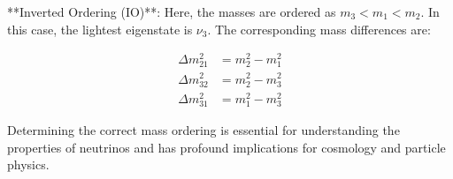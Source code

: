 **Inverted Ordering (IO)**: Here, the masses are ordered as \( m_3 < m_1 < m_2 \).
In this case, the lightest eigenstate is $\nu_3$.
The corresponding mass differences are:

\begin{align}
  \Delta m_{21}^2 &= m_2^2 - m_1^2 \\
  \Delta m_{32}^2 &= m_2^2 - m_3^2 \\
  \Delta m_{31}^2 &= m_1^2 - m_3^2
\end{align}

Determining the correct mass ordering is essential for understanding the properties of neutrinos and has profound implications for cosmology and particle physics.
